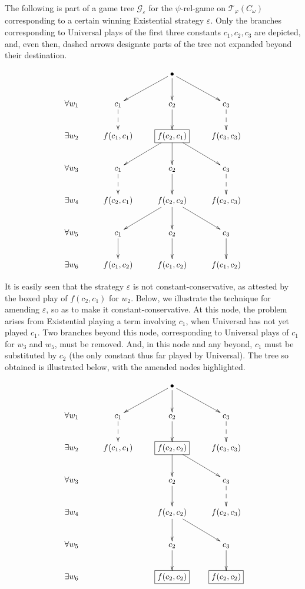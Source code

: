 \documentclass{LMCS}
\begin{document}
The following is part of a game tree $\mathscr{G}_\varepsilon$ for the $\psi$-rel-game on $\mathcal{T}_\varphi(C_\omega)$ corresponding to a certain winning Existential strategy $\varepsilon$. Only the branches corresponding to Universal plays of the first three constants $c_1,c_2,c_3$ are depicted, and, even then, dashed arrows designate parts of the tree not expanded beyond their destination.


\[
\xymatrix{
 & & \bullet \ar[dl] \ar[d] \ar[dr] & \\
\forall w_1 & c_1 \ar@{-->}[d] & c_2 \ar[d] & c_3 \ar@{-->}[d]  \\
\exists w_2 & f(c_1,c_1) &*+[F]{f(c_2,c_1)} \ar[dl] \ar[d] \ar[dr]  & f(c_3,c_3)  \\
\forall w_3 & c_1 \ar@{-->}[d] & c_2 \ar[d] & c_3 \ar@{-->}[d]  \\
\exists w_4 & f(c_2,c_1) & f(c_2,c_2) \ar[dl] \ar[d] \ar[dr] & f(c_2,c_3)  \\
\forall w_5 & c_1 \ar[d] & c_2 \ar[d] & c_3 \ar[d]  \\
\exists w_6 & f(c_1,c_2) & f(c_1,c_2) & f(c_1,c_2) \\
}
\]
 \medskip

It is easily seen that the strategy $\varepsilon$ is not constant-conservative, as attested by the boxed play of $f(c_2,c_1)$ for $w_2$. Below, we illustrate the technique for amending $\varepsilon$, so as to make it constant-conservative. At this node, the problem arises from Existential playing a term involving $c_1$, when Universal has not yet played $c_1$. Two branches beyond this node, corresponding to Universal plays of $c_1$ for $w_3$ and $w_5$, must be removed. And, in this node and any beyond, $c_1$ must be substituted by $c_2$ (the only constant thus far played by Universal). The tree so obtained is illustrated below, with the amended nodes highlighted.

\[
\xymatrix{
 & & \bullet \ar[dl] \ar[d] \ar[dr] & \\
\forall w_1 & c_1 \ar@{-->}[d] & c_2 \ar[d] & c_3 \ar@{-->}[d]  \\
\exists w_2 & f(c_1,c_1) & *+[F]{f(c_2,c_2)}  \ar[d] \ar[dr]  & f(c_3,c_3)  \\
\forall w_3 & & c_2 \ar[d] & c_3 \ar@{-->}[d]  \\
\exists w_4 & & f(c_2,c_2) \ar[d] \ar[dr] & f(c_2,c_3)  \\
\forall w_5 & & c_2 \ar[d] & c_3 \ar[d]  \\
\exists w_6 & & *+[F]{f(c_2,c_2)} & *+[F]{f(c_2,c_2)} \\
}
\] \medskip
\end{document}
